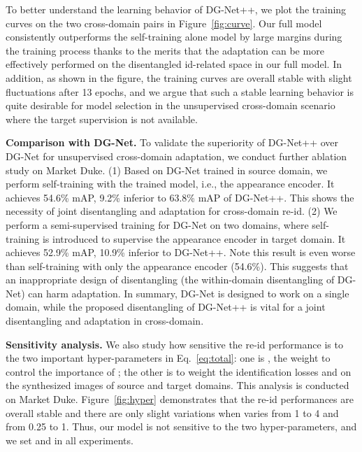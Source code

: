 \documentclass[runningheads]{llncs}
\begin{document}
To better understand the learning behavior of DG-Net++, we plot the training curves on the two cross-domain pairs in Figure~\ref{fig:curve}. Our full model consistently outperforms the self-training alone model by large margins during the training process thanks to the merits that the adaptation can be more effectively performed on the disentangled id-related space in our full model. In addition, as shown in the figure, the training curves are overall stable with slight fluctuations after 13 epochs, and we argue that such a stable learning behavior is quite desirable for model selection in the unsupervised cross-domain scenario where the target supervision is not available. 

\noindent\textbf{Comparison with DG-Net.} To validate the superiority of DG-Net++ over DG-Net for unsupervised cross-domain adaptation, we conduct further ablation study on Market  Duke. (1) Based on DG-Net trained in source domain, we perform self-training with the trained model, i.e., the appearance encoder. It achieves 54.6\% mAP, 9.2\% inferior to 63.8\% mAP of DG-Net++. This shows the necessity of joint disentangling and adaptation for cross-domain re-id. (2) We perform a semi-supervised training for DG-Net on two domains, where self-training is introduced to supervise the appearance encoder in target domain. It achieves 52.9\% mAP, 10.9\% inferior to DG-Net++. Note this result is even worse than self-training with only the appearance encoder (54.6\%). This suggests that an inappropriate design of disentangling (the within-domain disentangling of DG-Net) can harm adaptation. In summary, DG-Net is designed to work on a single domain, while the proposed disentangling of DG-Net++ is vital for a joint disentangling and adaptation in cross-domain.



\noindent\textbf{Sensitivity analysis.} We also study how sensitive the re-id performance is to the two important hyper-parameters in Eq.~\ref{eq:total}: one is , the weight to control the importance of ; the other is  to weight the identification losses  and  on the synthesized images of source and target domains. This analysis is conducted on Market  Duke. Figure~\ref{fig:hyper} demonstrates that the re-id performances are overall stable and there are only slight variations when  varies from 1 to 4 and  from 0.25 to 1. Thus, our model is not sensitive to the two hyper-parameters, and we set  and  in all experiments.
\end{document}

